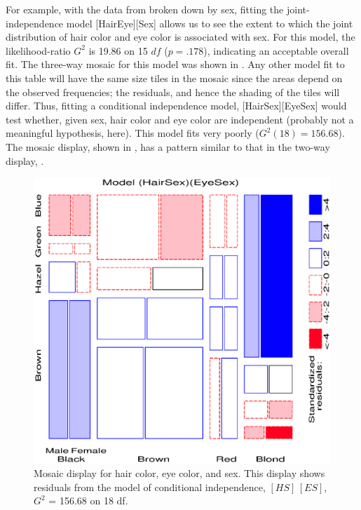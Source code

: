 For example, with the data from  broken down
by sex, fitting the joint-independence model [HairEye][Sex] allows us to see the extent
to which the joint distribution of hair color and eye color is
associated with sex.  For this model, the likelihood-ratio \(G^2\) is
19.86 on 15 \(df\) (\(p  =  .178\)), indicating an acceptable overall fit.
The three-way mosaic for this model was shown in .
Any other model fit to this table will have the same size tiles in the mosaic
since the areas depend on the observed frequencies;  the residuals,
and hence the shading of the tiles will differ.
Thus, fitting a conditional independence model, [HairSex][EyeSex]
would test whether, given sex, hair color and eye color are independent
(probably not a meaningful hypothesis, here).
This model fits very poorly ($G^2 (18) = 156.68$).
The mosaic display, shown in , has a pattern
similar to that in the two-way display, .

\begin{figure}[!htb]
  \centering
  \includegraphics[scale=.6]{ch4/fig/mosaic36}
  \caption[Three-way mosaic, conditional independence]{Mosaic display for hair color, eye
color, and sex.  This display shows residuals from the model of
conditional independence, \([HS] \,  [ES] \), \(G^2\) = 156.68 on 18 df.}
  \label{fig:mosaic36}
\end{figure}

